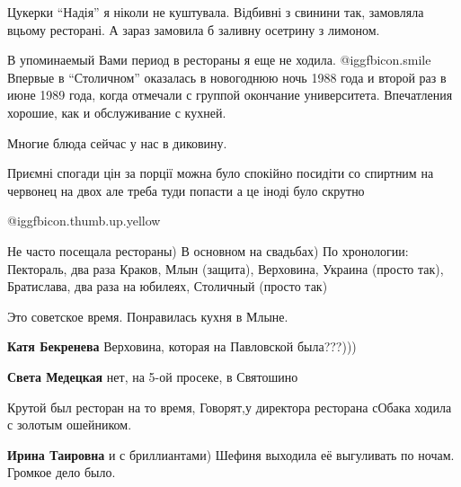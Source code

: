  
 
 
 
 
\zzSecCmt

\begin{itemize} %

Цукерки \enquote{Надія} я ніколи не куштувала. Відбивні з свинини так, замовляла вцьому
ресторані. А зараз замовила б заливну осетрину з лимоном.



В упоминаемый Вами период в рестораны я еще не ходила. @igg{fbicon.smile} Впервые в \enquote{Столичном}
оказалась в новогоднюю ночь 1988 года и второй раз в июне 1989 года, когда
отмечали с группой окончание университета. Впечатления хорошие, как и
обслуживание с кухней.


Многие блюда сейчас у нас в диковину.


Приємні спогади цін за порції можна було спокійно посидіти со спиртним на
червонец на двох але треба туди попасти а це іноді було скрутно

 @igg{fbicon.thumb.up.yellow} 


Не часто посещала рестораны) В основном на свадьбах) По хронологии: Пектораль,
два раза Краков, Млын (защита), Верховина, Украина (просто так), Братислава,
два раза на юбилеях, Столичный (просто так)

Это советское время. Понравилась кухня в Млыне.

\begin{itemize} %
\textbf{Катя Бекренева} Верховина, которая на Павловской была???)))

\textbf{Света Медецкая} нет, на 5-ой просеке, в Святошино
\end{itemize} %

Крутой был ресторан на то время,
Говорят,у директора ресторана сОбака ходила с золотым ошейником.

\textbf{Ирина Таировна} и с бриллиантами) Шефиня выходила её выгуливать по ночам. Громкое дело было.


\end{itemize}
